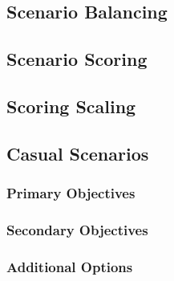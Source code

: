 \subsection{Scenario Balancing}



\subsection{Scenario Scoring}
\label{subsec:scenario_scoring}



\subsection{Scoring Scaling}



\newpage

\subsection{Casual Scenarios}



\subsubsection{Primary Objectives}



\subsubsection{Secondary Objectives}



\subsubsection{Additional Options}



\newpage

